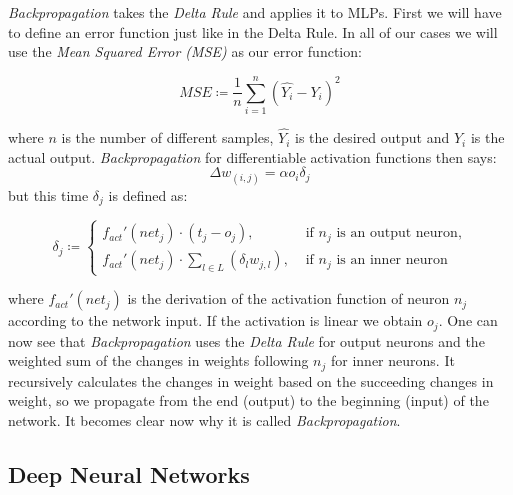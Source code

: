\emph{Backpropagation} takes the \emph{Delta Rule} and applies it to MLPs.
First we will have to define an error function just like in the Delta Rule.
In all of our cases we will use the \emph{Mean Squared Error (MSE)} as our error function:
\begin{defn}
\begin{equation} \label{eq:mse}
	MSE \coloneqq \frac{1}{n} \sum_{i=1}^n(\hat{Y_i} - Y_i)^2
\end{equation}
\end{defn}
where $n$ is the number of different samples,
$\hat{Y_i}$ is the desired output and
$Y_i$ is the actual output.
\emph{Backpropagation} for differentiable activation functions then says:
\begin{equation} \label{eq:backprop}
	\Delta w_{(i,j)} = \alpha o_i \delta_j
\end{equation}
but this time $\delta_j$ is defined as:
\begin{defn}
\begin{equation} \label{eq:backprop_delta}
	\delta_j \coloneqq
	\begin{cases}
		f_{act}'(net_j) \cdot (t_j - o_j),											& \text{ if $n_j$ is an output neuron,}\\
		f_{act}'(net_j) \cdot \sum_{l \in L}(\delta_l w_{j,l}),	& \text{ if $n_j$ is an inner neuron}
	\end{cases}
\end{equation}
\end{defn}
where $f_{act}'(net_j)$ is the derivation of the activation function of neuron $n_j$ according to the network input. If the activation is linear we obtain $o_j$.
One can now see that \emph{Backpropagation} uses the \emph{Delta Rule} for output neurons and the weighted sum of the changes in weights following $n_j$ for inner neurons.
It recursively calculates the changes in weight based on the succeeding changes in weight, so we propagate from the end (output) to the beginning (input) of the network.
It becomes clear now why it is called \emph{Backpropagation}.


\subsection{Deep Neural Networks}

